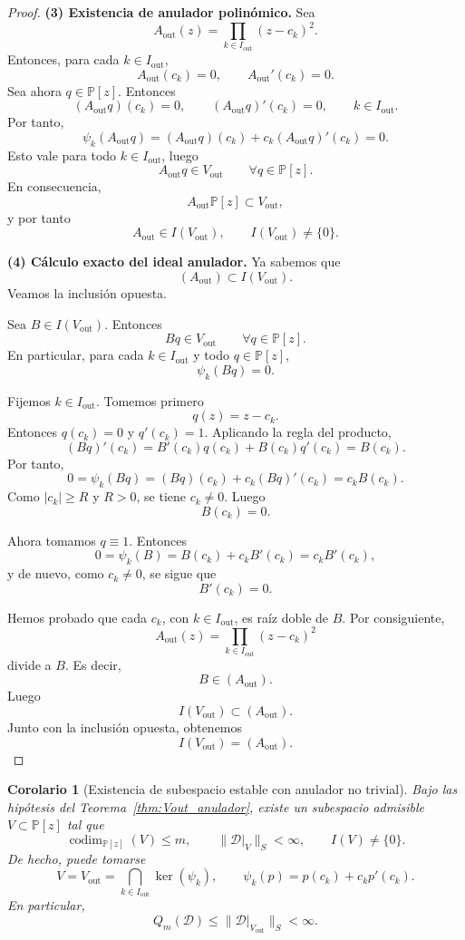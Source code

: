 \documentclass[12pt,a4paper]{article}
\newtheorem{corollary}{Corolario}
\theoremstyle{definition}
\theoremstyle{remark}
\newcommand{\Poly}{\mathbb{P}[z]}
\newcommand{\D}{\mathcal{D}}
\begin{document}
\begin{proof}
  \medskip
  \textbf{(3) Existencia de anulador polinómico.}
  Sea
  \[
    A_{\mathrm{out}}(z)=\prod_{k\in I_{\mathrm{out}}}(z-c_k)^2.
  \]
  Entonces, para cada $k\in I_{\mathrm{out}}$,
  \[
    A_{\mathrm{out}}(c_k)=0,
    \qquad
    A_{\mathrm{out}}'(c_k)=0.
  \]
  Sea ahora $q\in\Poly$. Entonces
  \[
    (A_{\mathrm{out}}q)(c_k)=0,
    \qquad
    (A_{\mathrm{out}}q)'(c_k)=0,
    \qquad k\in I_{\mathrm{out}}.
  \]
  Por tanto,
  \[
    \psi_k(A_{\mathrm{out}}q)
    =
    (A_{\mathrm{out}}q)(c_k)+c_k(A_{\mathrm{out}}q)'(c_k)
    =
    0.
  \]
  Esto vale para todo $k\in I_{\mathrm{out}}$, luego
  \[
    A_{\mathrm{out}}q\in V_{\mathrm{out}}
    \qquad \forall q\in\Poly.
  \]
  En consecuencia,
  \[
    A_{\mathrm{out}}\Poly\subset V_{\mathrm{out}},
  \]
  y por tanto
  \[
    A_{\mathrm{out}}\in I(V_{\mathrm{out}}),
    \qquad
    I(V_{\mathrm{out}})\neq\{0\}.
  \]

  \medskip
  \textbf{(4) Cálculo exacto del ideal anulador.}
  Ya sabemos que
  \[
    (A_{\mathrm{out}})\subset I(V_{\mathrm{out}}).
  \]
  Veamos la inclusión opuesta.

  Sea $B\in I(V_{\mathrm{out}})$. Entonces
  \[
    Bq\in V_{\mathrm{out}}
    \qquad \forall q\in\Poly.
  \]
  En particular, para cada $k\in I_{\mathrm{out}}$ y todo $q\in\Poly$,
  \[
    \psi_k(Bq)=0.
  \]

  Fijemos $k\in I_{\mathrm{out}}$. Tomemos primero
  \[
    q(z)=z-c_k.
  \]
  Entonces $q(c_k)=0$ y $q'(c_k)=1$. Aplicando la regla del producto,
  \[
    (Bq)'(c_k)=B'(c_k)q(c_k)+B(c_k)q'(c_k)=B(c_k).
  \]
  Por tanto,
  \[
    0=\psi_k(Bq)=(Bq)(c_k)+c_k(Bq)'(c_k)=c_kB(c_k).
  \]
  Como $|c_k|\ge R$ y $R>0$, se tiene $c_k\neq 0$. Luego
  \[
    B(c_k)=0.
  \]

  Ahora tomamos $q\equiv 1$. Entonces
  \[
    0=\psi_k(B)=B(c_k)+c_kB'(c_k)=c_kB'(c_k),
  \]
  y de nuevo, como $c_k\neq 0$, se sigue que
  \[
    B'(c_k)=0.
  \]

  Hemos probado que cada $c_k$, con $k\in I_{\mathrm{out}}$, es raíz doble de $B$.
  Por consiguiente,
  \[
    A_{\mathrm{out}}(z)=\prod_{k\in I_{\mathrm{out}}}(z-c_k)^2
  \]
  divide a $B$. Es decir,
  \[
    B\in (A_{\mathrm{out}}).
  \]
  Luego
  \[
    I(V_{\mathrm{out}})\subset (A_{\mathrm{out}}).
  \]
  Junto con la inclusión opuesta, obtenemos
  \[
    I(V_{\mathrm{out}})=(A_{\mathrm{out}}).
  \]
\end{proof}

\begin{corollary}[Existencia de subespacio estable con anulador no trivial]
  \label{cor:existencia_V_estable_anulador}
  Bajo las hipótesis del Teorema~\ref{thm:Vout_anulador}, existe un subespacio admisible
  $V\subset \Poly$ tal que
  \[
    \operatorname{codim}_{\Poly}(V)\le m,
    \qquad
    \|\D|_V\|_S<\infty,
    \qquad
    I(V)\neq \{0\}.
  \]
  De hecho, puede tomarse
  \[
    V=V_{\mathrm{out}}=\bigcap_{k\in I_{\mathrm{out}}}\ker(\psi_k),
    \qquad
    \psi_k(p)=p(c_k)+c_kp'(c_k).
  \]
  En particular,
  \[
    Q_m(\D)\le \|\D|_{V_{\mathrm{out}}}\|_S<\infty.
  \]
\end{corollary}
\end{document}
